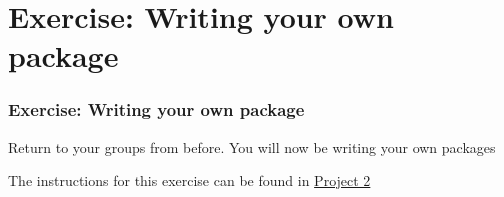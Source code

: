 \documentclass[10pt]{beamer}
\begin{document}
\section{Exercise: Writing your own package}

\begin{frame} \frametitle{Exercise: Writing your own package}

  Return to your groups from before. You will now be writing your own packages

  \vspace{0.25cm}

  The instructions for this exercise can be found in
  \href{https://github.com/nyupredocs/modularizationandtesting/blob/master/Projects/Project_2_PackageBuilding.md}{Project 2}

\end{frame}
\end{document}
